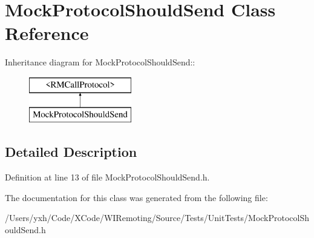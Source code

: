 \hypertarget{interface_mock_protocol_should_send}{
\section{MockProtocolShouldSend Class Reference}
\label{interface_mock_protocol_should_send}
}
Inheritance diagram for MockProtocolShouldSend::\begin{figure}[H]
\begin{center}
\leavevmode
\includegraphics[height=2cm]{interface_mock_protocol_should_send}
\end{center}
\end{figure}


\subsection{Detailed Description}


Definition at line 13 of file MockProtocolShouldSend.h.

The documentation for this class was generated from the following file:\begin{DoxyCompactItemize}
\item 
/Users/yxh/Code/XCode/WIRemoting/Source/Tests/UnitTests/MockProtocolShouldSend.h\end{DoxyCompactItemize}
